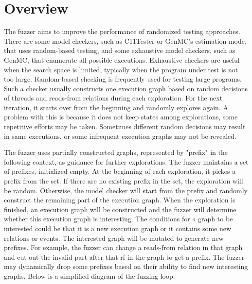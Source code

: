 \section{Overview}

The fuzzer aims to improve the performance of randomized testing approaches. There are some model checkers, such as C11Tester or GenMC's estimation mode, that uses random-based testing, and some exhaustive model checkers, such as GenMC, that enumerate all possible executions. Exhaustive checkers are useful when the search space is limited, typically when the program under test is not too large. Random-based checking is frequently used for testing large programs. Such a checker usually constructs one execution graph based on random decisions of threads and reads-from relations during each exploration. For the next iteration, it starts over from the beginning and randomly explores again. A problem with this is because it does not keep states among explorations, some repetitive efforts may be taken. Sometimes different random decisions may result in same executions, or some infrequent execution graphs may not be revealed. 

The fuzzer uses partially constructed graphs, represented by "prefix" in the following context, as guidance for further explorations. 
The fuzzer maintains a set of prefixes, initialized empty. At the beginning of each exploration, it pickes a prefix from the set. If there are no existing prefix in the set, the exploration will be random. Otherwise, the model checker will start from the prefix and randomly construct the remaining part of the execution graph. When the exploration is finished, an execution graph will be constructed and the fuzzer will determine whether this execution graph is interesting. The conditions for a graph to be interested could be that it is a new execution graph or it contains some new relations or events. The interested graph will be mutated to generate new prefixes. For example, the fuzzer can change a reads-from relation in that graph and cut out the invalid part after that rf in the graph to get a prefix. The fuzzer may dynamically drop some prefixes based on their ability to find new interesting graphs. Below is a simplified diagram of the fuzzing loop.



